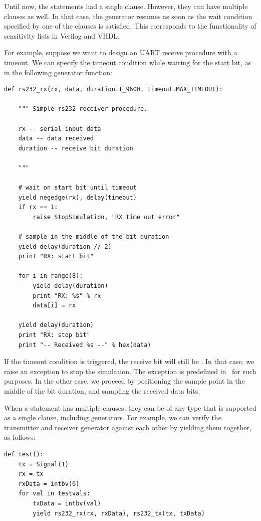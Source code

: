 Until now, the  statements had a single clause. However,
they can have multiple clauses as well. In that case, the generator
resumes as soon as the wait condition specified by one
of the clauses is satisfied. This corresponds to the functionality of
sensitivity lists in Verilog and VHDL.

For example, suppose we want to design an UART receive procedure with
a timeout. We can specify the timeout condition while waiting for the
start bit, as in the following generator function:

\begin{verbatim}
def rs232_rx(rx, data, duration=T_9600, timeout=MAX_TIMEOUT):
    
    """ Simple rs232 receiver procedure.

    rx -- serial input data
    data -- data received
    duration -- receive bit duration
    
    """

    # wait on start bit until timeout
    yield negedge(rx), delay(timeout)
    if rx == 1:
        raise StopSimulation, "RX time out error"

    # sample in the middle of the bit duration
    yield delay(duration // 2)
    print "RX: start bit"

    for i in range(8):
        yield delay(duration)
        print "RX: %s" % rx
        data[i] = rx

    yield delay(duration)
    print "RX: stop bit"
    print "-- Received %s --" % hex(data)
\end{verbatim}

If the timeout condition is triggered, the receive bit 
will still be . In that case, we raise an exception to stop
the simulation. The  exception is predefined in
\myhdl\ for such purposes. In the other case, we proceed by
positioning the sample point in the middle of the bit duration, and
sampling the received data bits.

When a  statement has multiple clauses, they can be of any
type that is supported as a single clause, including generators. For
example, we can verify the transmitter and receiver generator against
each other by yielding them together, as follows:

\begin{verbatim}
def test():
    tx = Signal(1)
    rx = tx
    rxData = intbv(0)
    for val in testvals:
        txData = intbv(val)
        yield rs232_rx(rx, rxData), rs232_tx(tx, txData)
\end{verbatim}

